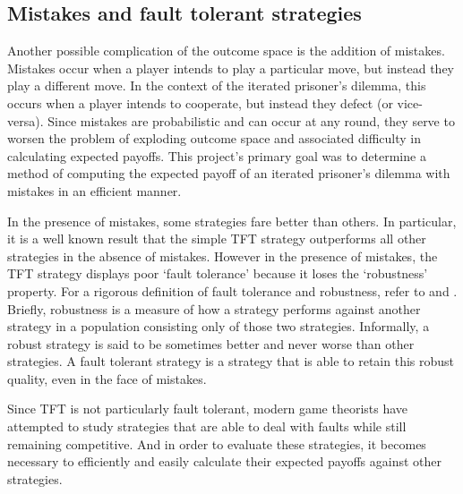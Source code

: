 \documentclass[a4paper,12pt]{article}
\begin{document}
\subsection*{Mistakes and fault tolerant strategies}

Another possible complication of the outcome space is the addition of mistakes.
Mistakes occur when a player intends to play a particular move, but instead they play a different move.
In the context of the iterated prisoner's dilemma, this occurs when a player intends to cooperate, but instead they defect (or vice-versa).
Since mistakes are probabilistic and can occur at any round, they serve to worsen the problem of exploding outcome space and associated difficulty in calculating expected payoffs.
This project's primary goal was to determine a method of computing the expected payoff of an iterated prisoner's dilemma with mistakes in an efficient manner.

In the presence of mistakes, some strategies fare better than others.
In particular, it is a well known result \cite{axelrod} that the simple TFT strategy outperforms all other strategies in the absence of mistakes.
However in the presence of mistakes, the TFT strategy displays poor `fault tolerance' because it loses the `robustness' property.
For a rigorous definition of fault tolerance and robustness, refer to \cite{pelc} and \cite{pelcpelc}.
Briefly, robustness is a measure of how a strategy performs against another strategy in a population consisting only of those two strategies.
Informally, a robust strategy is said to be sometimes better and never worse than other strategies.
A fault tolerant strategy is a strategy that is able to retain this robust quality, even in the face of mistakes.

Since TFT is not particularly fault tolerant, modern game theorists have attempted to study strategies that are able to deal with faults while still remaining competitive.
And in order to evaluate these strategies, it becomes necessary to efficiently and easily calculate their expected payoffs against other strategies.
\end{document}
